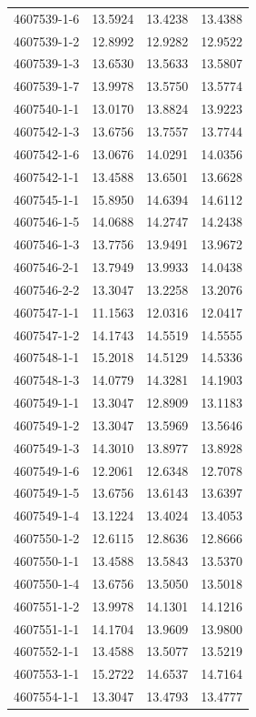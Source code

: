 \begin{longtable}{lrrr}
4607539-1-6 & 13.5924 & 13.4238 & 13.4388 \\
4607539-1-2 & 12.8992 & 12.9282 & 12.9522 \\
4607539-1-3 & 13.6530 & 13.5633 & 13.5807 \\
4607539-1-7 & 13.9978 & 13.5750 & 13.5774 \\
4607540-1-1 & 13.0170 & 13.8824 & 13.9223 \\
4607542-1-3 & 13.6756 & 13.7557 & 13.7744 \\
4607542-1-6 & 13.0676 & 14.0291 & 14.0356 \\
4607542-1-1 & 13.4588 & 13.6501 & 13.6628 \\
4607545-1-1 & 15.8950 & 14.6394 & 14.6112 \\
4607546-1-5 & 14.0688 & 14.2747 & 14.2438 \\
4607546-1-3 & 13.7756 & 13.9491 & 13.9672 \\
4607546-2-1 & 13.7949 & 13.9933 & 14.0438 \\
4607546-2-2 & 13.3047 & 13.2258 & 13.2076 \\
4607547-1-1 & 11.1563 & 12.0316 & 12.0417 \\
4607547-1-2 & 14.1743 & 14.5519 & 14.5555 \\
4607548-1-1 & 15.2018 & 14.5129 & 14.5336 \\
4607548-1-3 & 14.0779 & 14.3281 & 14.1903 \\
4607549-1-1 & 13.3047 & 12.8909 & 13.1183 \\
4607549-1-2 & 13.3047 & 13.5969 & 13.5646 \\
4607549-1-3 & 14.3010 & 13.8977 & 13.8928 \\
4607549-1-6 & 12.2061 & 12.6348 & 12.7078 \\
4607549-1-5 & 13.6756 & 13.6143 & 13.6397 \\
4607549-1-4 & 13.1224 & 13.4024 & 13.4053 \\
4607550-1-2 & 12.6115 & 12.8636 & 12.8666 \\
4607550-1-1 & 13.4588 & 13.5843 & 13.5370 \\
4607550-1-4 & 13.6756 & 13.5050 & 13.5018 \\
4607551-1-2 & 13.9978 & 14.1301 & 14.1216 \\
4607551-1-1 & 14.1704 & 13.9609 & 13.9800 \\
4607552-1-1 & 13.4588 & 13.5077 & 13.5219 \\
4607553-1-1 & 15.2722 & 14.6537 & 14.7164 \\
4607554-1-1 & 13.3047 & 13.4793 & 13.4777 \\

\end{longtable}
